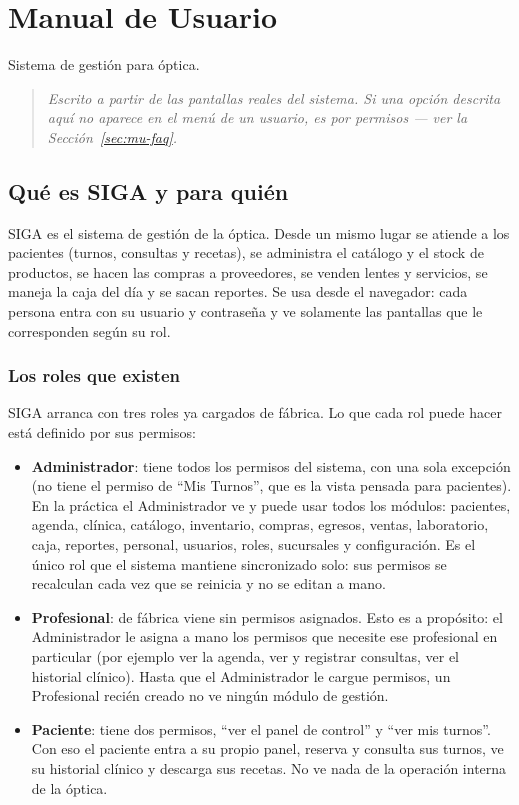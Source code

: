 \chapter{Manual de Usuario}
\label{sec:manual-usuario}

Sistema de gestión para óptica.

\begin{quote}
\itshape
Escrito a partir de las pantallas reales del sistema. Si una opción descrita aquí no aparece en el menú de un usuario, es por permisos --- ver la Sección~\ref{sec:mu-faq}.
\end{quote}

\section{Qué es SIGA y para quién}
\label{sec:mu-que-es}

SIGA es el sistema de gestión de la óptica. Desde un mismo lugar se atiende a los pacientes (turnos, consultas y recetas), se administra el catálogo y el stock de productos, se hacen las compras a proveedores, se venden lentes y servicios, se maneja la caja del día y se sacan reportes. Se usa desde el navegador: cada persona entra con su usuario y contraseña y ve solamente las pantallas que le corresponden según su rol.

\subsection{Los roles que existen}
\label{sec:mu-roles-existentes}

SIGA arranca con tres roles ya cargados de fábrica. Lo que cada rol puede hacer está definido por sus permisos:

\begin{itemize}
  \item \textbf{Administrador}: tiene todos los permisos del sistema, con una sola excepción (no tiene el permiso de ``Mis Turnos'', que es la vista pensada para pacientes). En la práctica el Administrador ve y puede usar todos los módulos: pacientes, agenda, clínica, catálogo, inventario, compras, egresos, ventas, laboratorio, caja, reportes, personal, usuarios, roles, sucursales y configuración. Es el único rol que el sistema mantiene sincronizado solo: sus permisos se recalculan cada vez que se reinicia y no se editan a mano.
  \item \textbf{Profesional}: de fábrica viene sin permisos asignados. Esto es a propósito: el Administrador le asigna a mano los permisos que necesite ese profesional en particular (por ejemplo ver la agenda, ver y registrar consultas, ver el historial clínico). Hasta que el Administrador le cargue permisos, un Profesional recién creado no ve ningún módulo de gestión.
  \item \textbf{Paciente}: tiene dos permisos, ``ver el panel de control'' y ``ver mis turnos''. Con eso el paciente entra a su propio panel, reserva y consulta sus turnos, ve su historial clínico y descarga sus recetas. No ve nada de la operación interna de la óptica.
\end{itemize}

